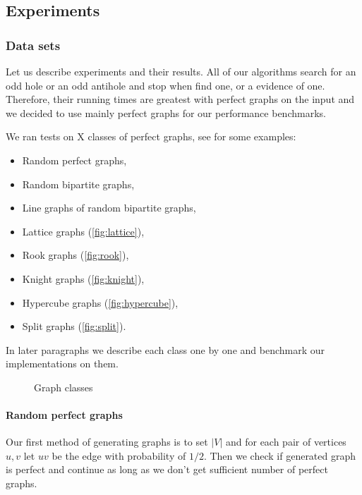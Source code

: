 \subsection{Experiments}
\label{sec:experiments}

\subsubsection{Data sets}

Let us describe experiments and their results. All of our algorithms search for an odd hole or an odd antihole and stop when find one, or a evidence of one. Therefore, their running times are greatest with perfect graphs on the input and we decided to use mainly perfect graphs for our performance benchmarks.

We ran tests on X classes of perfect graphs, see  for some examples:
\begin{itemize}
  \item Random perfect graphs,
  \item Random bipartite graphs,
  \item Line graphs of random bipartite graphs,
  \item Lattice graphs (\cref{fig:lattice}),
  \item Rook graphs (\cref{fig:rook}),
  \item Knight graphs (\cref{fig:knight}),
  \item Hypercube graphs (\cref{fig:hypercube}),
  \item Split graphs (\cref{fig:split}).
\end{itemize}

In later paragraphs we describe each class one by one and benchmark our implementations on them.

\begin{figure}
  
  \caption{Graph classes}
  \label{fig:graphClasses}
\end{figure}

\paragraph{Random perfect graphs}
Our first method of generating graphs is to set $|V|$ and for each pair of vertices $u, v$ let $uv$ be the edge with probability of $1/2$. Then we check if generated graph is perfect and continue as long as we don't get sufficient number of perfect graphs.

